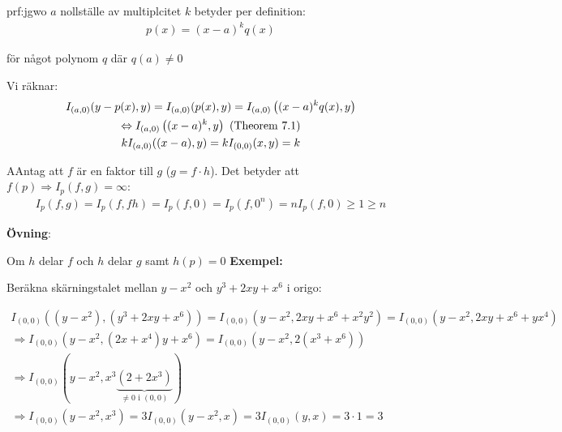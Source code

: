 \begin{prf}{prf:jgwo}
  $a$ nollställe av multiplcitet $k$ betyder per definition:
  \begin{equation*}
    \begin{gathered}
      p(x) = (x-a)^kq(x)
    \end{gathered}
  \end{equation*}\par
  \noindent för något polynom $q$ där $q(a)\neq0$\par
  \noindent Vi räknar:
  \begin{equation*}
    \begin{gathered}
      I_{(a,0)}(y-p(x),y) = I_{(a,0)}(p(x),y) = I_{(a,0)}\left((x-a)^kq(x),y\right)\\
      \Leftrightarrow I_{(a,0)}\left((x-a)^k,y\right)\text{ (Theorem 7.1)}\\
      kI_{(a,0)}((x-a),y) = kI_{(0,0)}(x,y) = k
    \end{gathered}
  \end{equation*}
\end{prf}
\par\bigskip
\begin{theo}
  AAntag att $f$ är en faktor till $g$ ($g=f\cdot h$). Det betyder att $f(p) \Rightarrow I_p(f,g)=\infty$:
  \begin{equation*}
    \begin{gathered}
    I_p(f,g) = I_p(f,fh) = I_p(f,0)=I_p(f,0^n) = nI_p(f,0)\geq1\geq n
    \end{gathered}
  \end{equation*}
\end{theo}
\par\bigskip
\noindent\textbf{Övning}:\par
\noindent Om $h$ delar $f$ och $h$ delar $g$ samt $h(p)=0$
\newpage
\noindent\textbf{Exempel:}\par
\noindent Beräkna skärningstalet mellan $y-x^2$ och $y^3+2xy+x^6$ i origo:\par
\begin{equation*}
  \begin{gathered}
    I_{(0,0)}((y-x^2), (y^3+2xy+x^6)) = I_{(0,0)}(y-x^2,2xy+x^6+x^2y^2) = I_{(0,0)}(y-x^2,2xy+x^6+yx^4)\\
    \Rightarrow I_{(0,0)}(y-x^2,(2x+x^4)y+x^6) = I_{(0,0)}(y-x^2,2(x^3+x^6))\\
    \Rightarrow I_{(0,0)}(y-x^2,x^3\underbrace{(2+2x^3)}_{\text{$\neq0$ i $(0,0)$}})\\
    \Rightarrow I_{(0,0)}(y-x^2,x^3) = 3I_{(0,0)}(y-x^2,x) = 3I_{(0,0)}(y,x) = 3\cdot1=3
  \end{gathered}
\end{equation*}
